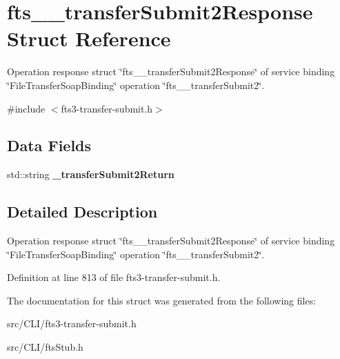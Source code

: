 \section{fts\_\-\_\-transferSubmit2Response Struct Reference}
\label{structfts____transferSubmit2Response}


Operation response struct \char`\"{}fts\_\-\_\-transferSubmit2Response\char`\"{} of service binding \char`\"{}FileTransferSoapBinding\char`\"{} operation \char`\"{}fts\_\-\_\-transferSubmit2\char`\"{}.  




{\ttfamily \#include $<$fts3-\/transfer-\/submit.h$>$}

\subsection*{Data Fields}
\begin{DoxyCompactItemize}
\item 
std::string {\bfseries \_\-transferSubmit2Return}\label{structfts____transferSubmit2Response_a68e065dc85df7d50137f3e4db5823654}

\end{DoxyCompactItemize}


\subsection{Detailed Description}
Operation response struct \char`\"{}fts\_\-\_\-transferSubmit2Response\char`\"{} of service binding \char`\"{}FileTransferSoapBinding\char`\"{} operation \char`\"{}fts\_\-\_\-transferSubmit2\char`\"{}. 

Definition at line 813 of file fts3-\/transfer-\/submit.h.



The documentation for this struct was generated from the following files:\begin{DoxyCompactItemize}
\item 
src/CLI/fts3-\/transfer-\/submit.h\item 
src/CLI/ftsStub.h\end{DoxyCompactItemize}

